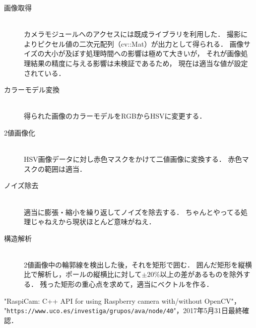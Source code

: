 \documentclass[11pt,a4paper]{jsarticle}
\begin{document}
  \begin{description}
    \item[画像取得] \mbox{} \\
      カメラモジュールへのアクセスには既成ライブラリ\cite{raspicam}を利用した．
      撮影によりピクセル値の二次元配列（cv::Mat）が出力として得られる．
      画像サイズの大小が及ぼす処理時間への影響は極めて大きいが，
      それが画像処理結果の精度に与える影響は未検証であるため，
      現在は適当な値が設定されている．\\
    \item[カラーモデル変換] \mbox{} \\
      得られた画像のカラーモデルをRGBからHSVに変更する．\\
    \item[2値画像化] \mbox{} \\
      HSV画像データに対し赤色マスクをかけて二値画像に変換する．
      赤色マスクの範囲は適当．\\
    \item[ノイズ除去] \mbox{} \\
      適当に膨張・縮小を繰り返してノイズを除去する．
      ちゃんとやってる処理じゃねえから現状ほとんど意味がねえ．\\
    \item[構造解析] \mbox{} \\
      2値画像中の輪郭線を検出した後，それを矩形で囲む．
      囲んだ矩形を縦横比で解析し，ポールの縦横比に対して$\pm 20 \%$以上の差があるものを除外する．
      残った矩形の重心点を求めて，適当にベクトルを作る．\\
  \end{description}

\begin{thebibliography}{9}
   "RaspiCam: C++ API for using Raspberry camera with/without OpenCV"，\\
                     "\texttt{https://www.uco.es/investiga/grupos/ava/node/40}"，2017年5月31日最終確認．
\end{thebibliography}
\end{document}
